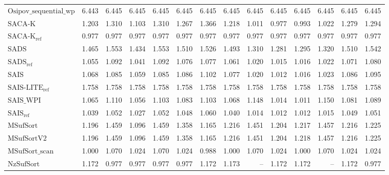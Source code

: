 \begin{table}
{\begin{tabular}{lrrrrrrrrrrrrr}
    $\text{Osipov\_sequential\_wp}$ & {\color{red}6.443} & {\color{red}6.445} & {\color{red}6.445} & {\color{red}6.445} & {\color{red}6.445} & {\color{red}6.445} & {\color{red}6.445} & {\color{red}6.445} & {\color{red}6.445} & {\color{red}6.445} & {\color{red}6.445} & {\color{red}6.445} & {\color{red}6.445} \\
    $\text{SACA-K}$ & 1.203 & 1.310 & 1.103 & 1.310 & 1.267 & 1.366 & 1.218 & 1.011 & 0.977 & 0.993 & 1.022 & 1.279 & 1.294 \\
    $\text{SACA-K}_{\text{ref}}$ & {\color{green!60!black}0.977} & {\color{green!60!black}0.977} & {\color{green!60!black}0.977} & {\color{green!60!black}0.977} & {\color{green!60!black}0.977} & {\color{green!60!black}0.977} & {\color{green!60!black}0.977} & {\color{green!60!black}0.977} & {\color{green!60!black}0.977} & {\color{green!60!black}0.977} & {\color{green!60!black}0.977} & {\color{green!60!black}0.977} & {\color{green!60!black}0.977} \\
    $\text{SADS}$ & 1.465 & 1.553 & 1.434 & 1.553 & 1.510 & 1.526 & 1.493 & 1.310 & 1.281 & 1.295 & 1.320 & 1.510 & 1.542 \\
    $\text{SADS}_{\text{ref}}$ & 1.055 & 1.092 & 1.041 & 1.092 & 1.076 & 1.077 & 1.061 & 1.020 & 1.015 & 1.016 & 1.022 & 1.071 & 1.080 \\
    $\text{SAIS}$ & 1.068 & 1.085 & 1.059 & 1.085 & 1.086 & 1.102 & 1.077 & 1.020 & 1.012 & 1.016 & 1.023 & 1.086 & 1.095 \\
    $\text{SAIS-LITE}_{\text{ref}}$ & 1.758 & 1.758 & 1.758 & 1.758 & 1.758 & 1.758 & 1.758 & 1.758 & 1.758 & 1.758 & 1.758 & 1.758 & 1.758 \\
    $\text{SAIS\_WPI}$ & 1.065 & 1.110 & 1.056 & 1.103 & 1.083 & 1.103 & 1.068 & 1.148 & 1.014 & 1.011 & 1.150 & 1.081 & 1.089 \\
    $\text{SAIS}_{\text{ref}}$ & 1.039 & 1.052 & 1.027 & 1.052 & 1.048 & 1.060 & 1.040 & 1.014 & 1.012 & 1.012 & 1.015 & 1.049 & 1.051 \\
    $\text{MSufSort}$ & 1.196 & 1.459 & 1.096 & 1.459 & 1.358 & 1.165 & 1.216 & 1.451 & 1.204 & 1.217 & 1.457 & 1.216 & 1.225 \\
    $\text{MSufSortV2}$ & 1.196 & 1.459 & 1.096 & 1.459 & 1.358 & 1.165 & 1.216 & 1.451 & 1.204 & 1.218 & 1.457 & 1.216 & 1.225 \\
    $\text{MSufSort\_scan}$ & 1.000 & 1.070 & 1.024 & 1.070 & 1.024 & 0.988 & 1.000 & 1.070 & 1.024 & 1.000 & 1.070 & 1.024 & 1.024 \\
    $\text{NzSufSort}$ & 1.172 & {\color{green!60!black}0.977} & {\color{green!60!black}0.977} & {\color{green!60!black}0.977} & 0.977 & 1.172 & 1.173 & {\color{darkgray}--} & 1.172 & 1.172 & {\color{darkgray}--} & 1.172 & 0.977 \\

\end{tabular}}
\end{table}
